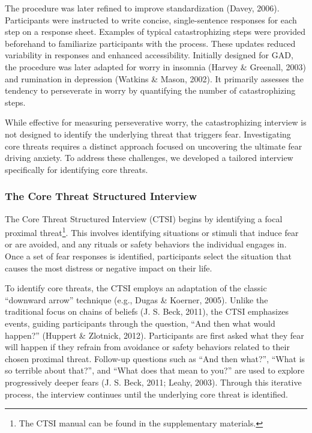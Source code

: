 \documentclass[
  man,floatsintext]{apa7}
\begin{document}
The procedure was later refined to improve standardization (Davey, 2006).
Participants were instructed to write concise, single-sentence responses for each step on a response sheet.
Examples of typical catastrophizing steps were provided beforehand to familiarize participants with the process.
These updates reduced variability in responses and enhanced accessibility.
Initially designed for GAD, the procedure was later adapted for worry in insomnia (Harvey \& Greenall, 2003) and rumination in depression (Watkins \& Mason, 2002).
It primarily assesses the tendency to perseverate in worry by quantifying the number of catastrophizing steps.

While effective for measuring perseverative worry, the catastrophizing interview is not designed to identify the underlying threat that triggers fear.
Investigating core threats requires a distinct approach focused on uncovering the ultimate fear driving anxiety.
To address these challenges, we developed a tailored interview specifically for identifying core threats.

\subsubsection{The Core Threat Structured Interview}\label{the-core-threat-structured-interview}

The Core Threat Structured Interview (CTSI) begins by identifying a focal proximal threat\footnote{The CTSI manual can be found in the supplementary materials.}.
This involves identifying situations or stimuli that induce fear or are avoided, and any rituals or safety behaviors the individual engages in.
Once a set of fear responses is identified, participants select the situation that causes the most distress or negative impact on their life.

To identify core threats, the CTSI employs an adaptation of the classic ``downward arrow'' technique (e.g., Dugas \& Koerner, 2005).
Unlike the traditional focus on chains of beliefs (J. S. Beck, 2011), the CTSI emphasizes events, guiding participants through the question, ``And then what would happen?'' (Huppert \& Zlotnick, 2012).
Participants are first asked what they fear will happen if they refrain from avoidance or safety behaviors related to their chosen proximal threat.
Follow-up questions such as ``And then what?'', ``What is so terrible about that?'', and ``What does that mean to you?'' are used to explore progressively deeper fears (J. S. Beck, 2011; Leahy, 2003).
Through this iterative process, the interview continues until the underlying core threat is identified.
\end{document}
